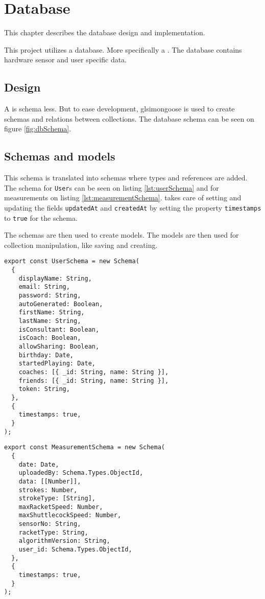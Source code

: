 \chapter{Database}
This chapter describes the database design and implementation.

This project utilizes a  database. More specifically a . The database contains hardware sensor and user specific data.

\section{Design}
A  is schema less.
But to ease development, glsi{mongoose} is used to create schemas and relations between collections.
The database schema can be seen on figure \ref{fig:dbSchema}.


\section{Schemas and models}
This schema is translated into  schemas where types and references are added.
The schema for \verb+User+s can be seen on listing \ref{lst:userSchema} and for measurements on listing \ref{lst:measurementSchema}.
 takes care of setting and updating the fields \verb+updatedAt+ and \verb+createdAt+ by setting the property \verb+timestamps+ to \verb+true+ for the schema.

The schemas are then used to create  models.
The models are then used for collection manipulation, like saving and creating.

\begin{lstlisting}[caption=Mongoose User Schema, label=lst:userSchema]
export const UserSchema = new Schema(
  {
    displayName: String,
    email: String,
    password: String,
    autoGenerated: Boolean,
    firstName: String,
    lastName: String,
    isConsultant: Boolean,
    isCoach: Boolean,
    allowSharing: Boolean,
    birthday: Date,
    startedPlaying: Date,
    coaches: [{ _id: String, name: String }],
    friends: [{ _id: String, name: String }],
    token: String,
  },
  {
    timestamps: true,
  }
);
\end{lstlisting}

\begin{lstlisting}[caption=Mongoose Measurement Schema, label=lst:measurementSchema]
export const MeasurementSchema = new Schema(
  {
    date: Date,
    uploadedBy: Schema.Types.ObjectId,
    data: [[Number]],
    strokes: Number,
    strokeType: [String],
    maxRacketSpeed: Number,
    maxShuttlecockSpeed: Number,
    sensorNo: String,
    racketType: String,
    algorithmVersion: String,
    user_id: Schema.Types.ObjectId,
  },
  {
    timestamps: true,
  }
);
\end{lstlisting}
